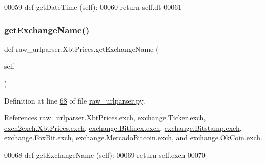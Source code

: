 \begin{DoxyCode}
00059     \textcolor{keyword}{def }getDateTime (self):
00060         \textcolor{keywordflow}{return} self.dt
00061         
\end{DoxyCode}
\mbox{\label{classraw__urlparser_1_1_xbt_prices_a63b0b449b67f9d1c05d5a3c45f52135a}} 
\subsubsection{\texorpdfstring{get\+Exchange\+Name()}{getExchangeName()}}
{\footnotesize\ttfamily def raw\+\_\+urlparser.\+Xbt\+Prices.\+get\+Exchange\+Name (\begin{DoxyParamCaption}\item[{}]{self }\end{DoxyParamCaption})}



Definition at line \hyperlink{raw__urlparser_8py_source_l00068}{68} of file \hyperlink{raw__urlparser_8py_source}{raw\+\_\+urlparser.\+py}.



References \hyperlink{raw__urlparser_8py_source_l00056}{raw\+\_\+urlparser.\+Xbt\+Prices.\+exch}, \hyperlink{exchange_8py_source_l00057}{exchange.\+Ticker.\+exch}, \hyperlink{exch2exch_8py_source_l00064}{exch2exch.\+Xbt\+Prices.\+exch}, \hyperlink{exchange_8py_source_l00424}{exchange.\+Bitfinex.\+exch}, \hyperlink{exchange_8py_source_l00499}{exchange.\+Bitstamp.\+exch}, \hyperlink{exchange_8py_source_l00567}{exchange.\+Fox\+Bit.\+exch}, \hyperlink{exchange_8py_source_l00639}{exchange.\+Mercado\+Bitcoin.\+exch}, and \hyperlink{exchange_8py_source_l00704}{exchange.\+Ok\+Coin.\+exch}.


\begin{DoxyCode}
00068     \textcolor{keyword}{def }getExchangeName (self):
00069         \textcolor{keywordflow}{return} self.exch
00070         
\end{DoxyCode}
\mbox{\label{classraw__urlparser_1_1_xbt_prices_a1a1d7e7b76f611ae334b0950b334dda1}} 
